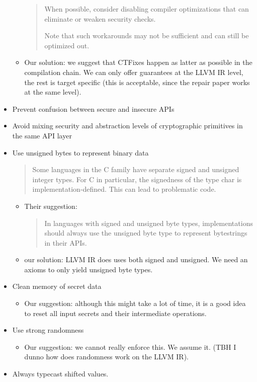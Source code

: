 \begin{itemize}
\begin{itemize}
\begin{quote}
When possible, consider disabling compiler optimizations that can eliminate or weaken security checks.

Note that such workarounds may not be sufficient and can still be optimized out.
\end{quote}
\item Our solution: we suggest that CTFixes happen as latter as possible in the compilation chain. We can only offer guarantees at the LLVM IR level, the rest is target specific (this is acceptable, since the repair paper works at the same level).
\end{itemize}

\item Prevent confusion between secure and insecure APIs
\item Avoid mixing security and abstraction levels of cryptographic primitives in the same API layer
\item Use unsigned bytes to represent binary data
\begin{quote}
Some languages in the C family have separate signed and unsigned integer types. For C in particular, the signedness of the type char is implementation-defined. This can lead to problematic code.
\end{quote}
\begin{itemize}
\item Their suggestion:
\begin{quote}
In languages with signed and unsigned byte types, implementations should always use the unsigned byte type to represent bytestrings in their APIs.
\end{quote}
\item our solution: LLVM IR does uses both signed and unsigned. We need an axioms to only yield unsigned byte types.
\end{itemize}
\item Clean memory of secret data
\begin{itemize}
\item Our suggestion: although this might take a lot of time, it is a good idea to reset all input secrets and their intermediate operations. 
\end{itemize}
\item Use strong randomness
\begin{itemize}
\item Our suggestion: we cannot really enforce this. We assume it. (TBH I dunno how does randomness work on the LLVM IR).
\end{itemize}
\item Always typecast shifted values.
\end{itemize}

